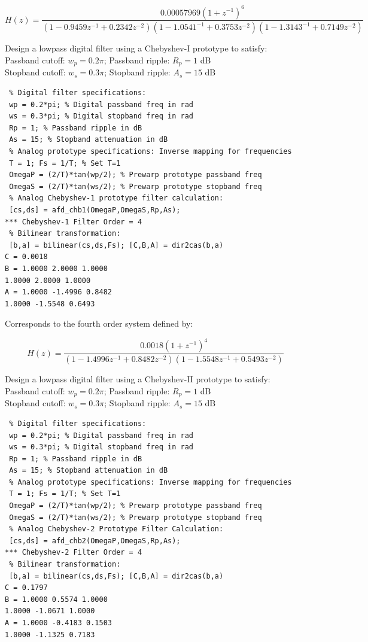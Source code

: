 \documentclass{article}
\begin{document}
\begin{center}
 $$H(z)=\frac{0.00057969(1+z^{-1})^6}{(1-0.9459z^{-1}+0.2342z^{-2})(1-1.0541^{-1}+0.3753z^{-2})(1-1.3143^{-1}+0.7149z^{-2})}$$   
\end{center}
\vspace{1em}
Design a lowpass digital filter using a Chebyshev-I prototype to satisfy: \\
\vspace{1em}
Passband cutoff: $w_p=0.2\pi$; Passband ripple: $R_p=1$ dB \\
\vspace{1em}
Stopband cutoff: $w_s=0.3\pi$; Stopband ripple: $A_s =15$ dB \\
\vspace{1em}
\begin{lstlisting}
 % Digital filter specifications:
 wp = 0.2*pi; % Digital passband freq in rad
 ws = 0.3*pi; % Digital stopband freq in rad
 Rp = 1; % Passband ripple in dB
 As = 15; % Stopband attenuation in dB
 % Analog prototype specifications: Inverse mapping for frequencies
 T = 1; Fs = 1/T; % Set T=1
 OmegaP = (2/T)*tan(wp/2); % Prewarp prototype passband freq
 OmegaS = (2/T)*tan(ws/2); % Prewarp prototype stopband freq
 % Analog Chebyshev-1 prototype filter calculation:
 [cs,ds] = afd_chb1(OmegaP,OmegaS,Rp,As);
*** Chebyshev-1 Filter Order = 4
 % Bilinear transformation:
 [b,a] = bilinear(cs,ds,Fs); [C,B,A] = dir2cas(b,a)
C = 0.0018
B = 1.0000 2.0000 1.0000
1.0000 2.0000 1.0000
A = 1.0000 -1.4996 0.8482
1.0000 -1.5548 0.6493    
\end{lstlisting}
Corresponds to the fourth order system defined by:
\begin{center}
    $$H(z)= \frac{0.0018(1+z^{-1})^4}{(1-1.4996z^{-1}+0.8482z^{-2})(1-1.5548z^{-1}+0.5493z^{-2})}$$
\end{center}
Design a lowpass digital filter using a Chebyshev-II prototype to satisfy: \\
\vspace{1em}
Passband cutoff: $w_p=0.2\pi$; Passband ripple: $R_p=1$ dB \\
\vspace{1em}
Stopband cutoff: $w_s=0.3\pi$; Stopband ripple: $A_s =15$ dB \\
\vspace{1em}
\begin{lstlisting}
 % Digital filter specifications:
 wp = 0.2*pi; % Digital passband freq in rad
 ws = 0.3*pi; % Digital stopband freq in rad
 Rp = 1; % Passband ripple in dB
 As = 15; % Stopband attenuation in dB
 % Analog prototype specifications: Inverse mapping for frequencies
 T = 1; Fs = 1/T; % Set T=1
 OmegaP = (2/T)*tan(wp/2); % Prewarp prototype passband freq
 OmegaS = (2/T)*tan(ws/2); % Prewarp prototype stopband freq
 % Analog Chebyshev-2 Prototype Filter Calculation:
 [cs,ds] = afd_chb2(OmegaP,OmegaS,Rp,As);
*** Chebyshev-2 Filter Order = 4
 % Bilinear transformation:
 [b,a] = bilinear(cs,ds,Fs); [C,B,A] = dir2cas(b,a)
C = 0.1797
B = 1.0000 0.5574 1.0000
1.0000 -1.0671 1.0000
A = 1.0000 -0.4183 0.1503
1.0000 -1.1325 0.7183    
\end{lstlisting}
\end{document}

